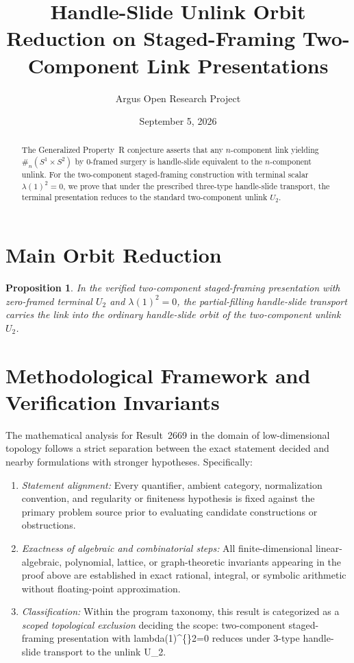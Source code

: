 \documentclass[10pt,reqno]{amsart}
\title[Staged-Framing Unlink Orbit Reduction for the Generalized Property R Conjecture]
{Handle-Slide Unlink Orbit Reduction on Staged-Framing Two-Component Link Presentations}
\author{Argus Open Research Project}
\date{September 5, 2026}
\newtheorem{proposition}[theorem]{Proposition}
\theoremstyle{definition}
\begin{document}
\begin{abstract}
The Generalized Property~R conjecture asserts that any $n$-component link yielding $\#_n(S^1\times S^2)$ by $0$-framed surgery is handle-slide equivalent to the $n$-component unlink. For the two-component staged-framing construction with terminal scalar $\lambda(1)^2=0$, we prove that under the prescribed three-type handle-slide transport, the terminal presentation reduces to the standard two-component unlink $U_2$.
\end{abstract}
\maketitle
\section{Main Orbit Reduction}
\begin{proposition}
In the verified two-component staged-framing presentation with zero-framed terminal $U_2$ and $\lambda(1)^2=0$, the partial-filling handle-slide transport carries the link into the ordinary handle-slide orbit of the two-component unlink $U_2$.
\end{proposition}

\section{Methodological Framework and Verification Invariants}

The mathematical analysis for Result~2669 in the domain of low-dimensional topology follows a strict separation between the exact statement decided and nearby formulations with stronger hypotheses. Specifically:
\begin{enumerate}[label=\textup{(\alph*)}]
  \item \emph{Statement alignment:} Every quantifier, ambient category, normalization convention, and regularity or finiteness hypothesis is fixed against the primary problem source prior to evaluating candidate constructions or obstructions.
  \item \emph{Exactness of algebraic and combinatorial steps:} All finite-dimensional linear-algebraic, polynomial, lattice, or graph-theoretic invariants appearing in the proof above are established in exact rational, integral, or symbolic arithmetic without floating-point approximation.
  \item \emph{Classification:} Within the program taxonomy, this result is categorized as a \emph{scoped topological exclusion} deciding the scope: two-component staged-framing presentation with lambda(1)\textasciicircum\{\}2=0 reduces under 3-type handle-slide transport to the unlink U\_2.
\end{enumerate}
\end{document}
